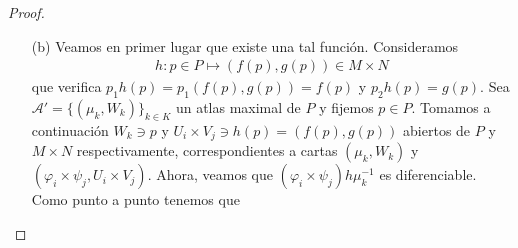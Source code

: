 \documentclass[11pt]{article}
\newcommand{\paint}[2]{\color{#1}{#2}}
\begin{document}
\begin{proof}
\begin{itemize}
\begin{align}
\end{align}
verifica
\begin{align*}
(\varphi_i \times \psi_j)|_W \circ ((\varphi_k \times \psi_l)|_W)^{-1}(x,y) & = (\varphi_i \times \psi_j) \circ (\varphi^{-1}_k \times \psi^{-1}_l) (x,y)\\
& =(\varphi_i\varphi^{-1}_k(x), \psi_j\psi^{-1}_l(y))
\end{align*}
para cada $(x,y) \in (\varphi_k \times \psi_l)(W) = \varphi_k(U_i \cap U_k) \times \psi_l(V_j \times V_l)$. Como por hip\'otesis tanto $\varphi_i\varphi^{-1}_k$ como $\psi_j\psi^{-1}_l$ son funciones diferenciables entre abiertos eucl\'ideos, es entonces $\varphi_i\varphi^{-1}_k \times \psi_j\psi^{-1}_l$ diferenciable y a la vez coincide con $\paint{purple}{(1)}$, lo que termina de probar que $\mathcal{A}$ dota a $M \times N$ de una estructura diferenciable. Los abiertos $U_i \times V_j$ son en particular abiertos de $\mathbb{R}^{n+m}$ lo que dice que $\dim M \times N = \dim M + \dim N = m+n$. Ahora veamos que las proyecciones son diferenciables. Fijamos $(x,y) \in M \times N$ y sea $(U_i \times V_j, \varphi_i  \times \psi_j)$ una carta en con $x \in U_i, y \in V_j$. Luego por construcci\'on de $\mathcal{A}$ sabemos que $\varphi_i$ es carta de $M$ con $x = p_1(x,y) \in p_1(U_i \times V_j) = U_i$ y $\psi_j$ es carta de $N$ con $y = p_2(x,y) \in p_2(U_i \times V_j) = V_j$. Basta entonces con probar que $\varphi_i p_1 (\varphi_i \times \psi_j)^{-1}$ y $\psi_j p_2 (\varphi_i \times \psi_j)^{-1}$ son diferenciables. \'Esta \'ultima es exactamente la proyecci\'on en la segunda coordenada $\tilde{p}_2 : \varphi_i(U_i) \times \psi_j(V_j) \to \psi_j(V_j)$, ya que si $(x,y) \in \varphi_i(U_i) \times \psi_j(V_j)$ entonces $\psi_j p_2 (\varphi_i \times \psi_j)^{-1}(x,y) = \varphi_i p_2 (\varphi_i^{-1}(x),\psi^{-1}_j(y)) = \psi_j(\psi^{-1}_j(y)) = y$. Similarmente $\varphi_i p_1 (\varphi_i \times \psi_j)^{-1}$ es la proyecci\'on de $\varphi_i(U_i) \times \psi_j(V_j)$ en la primera coordenada, y as\'i vemos que ambas proyecciones son diferenciables.
\item[(b)] Veamos en primer lugar que existe una tal funci\'on. Consideramos 
\begin{align*}
h : p \in P \mapsto (f(p),g(p)) \in M \times N
\end{align*}
que verifica $p_1h(p) = p_1(f(p), g(p)) = f(p)$ y $p_2h(p) = g(p)$. Sea $\mathcal{A}' = \{(\mu_k,W_k)\}_{k \in K}$ un atlas maximal de $P$ y fijemos $p \in P$. Tomamos a continuaci\'on $W_k \ni p$ y $U_i \times V_j \ni h(p) = (f(p),g(p))$ abiertos de $P$ y $M \times N$ respectivamente, correspondientes a cartas $(\mu_k,W_k)$ y $(\varphi_i \times \psi_j, U_i \times V_j)$. Ahora, veamos que $(\varphi_i \times \psi_j)h \mu_k^{-1}$ es diferenciable. Como punto a punto tenemos que

\end{itemize}
\end{proof}
\end{document}

